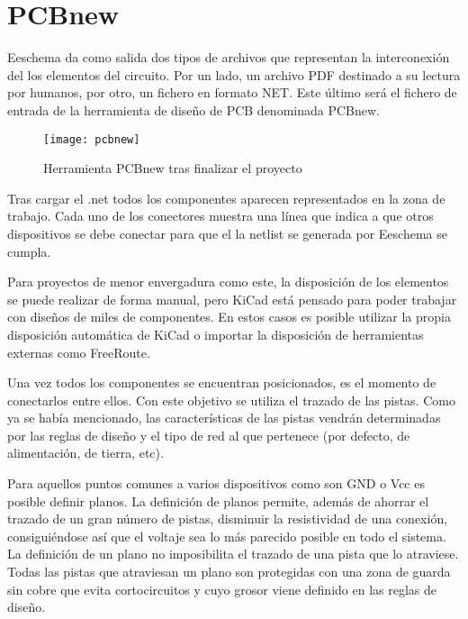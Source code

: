 \clearpage

\section{PCBnew\label{sec:PCBnew}}

Eeschema da como salida dos tipos de archivos que representan la interconexión del los elementos del circuito. Por un lado, un archivo PDF destinado a su lectura por humanos, por otro, un fichero en formato NET. Este último será el fichero de entrada de la herramienta de diseño de \acrshort{PCB} denominada PCBnew. 

\begin{figure} [h]
    \centering
    \texttt{[image: pcbnew]}
    \caption{Herramienta PCBnew tras finalizar el proyecto}
    \label{fig:pcbnew_1}
\end{figure}

Tras cargar el .net todos los componentes aparecen representados en la zona de trabajo. Cada uno de los conectores muestra una línea que indica a que otros dispositivos se debe conectar para que el la netlist se generada por Eeschema se cumpla.

Para proyectos de menor envergadura como este, la disposición de los elementos se puede realizar de forma manual, pero KiCad está pensado para poder trabajar con diseños de miles de componentes. En estos casos es posible utilizar la propia disposición automática de KiCad o importar la disposición de herramientas externas como FreeRoute.

Una vez todos los componentes se encuentran posicionados, es el momento de conectarlos entre ellos. Con este objetivo se utiliza el trazado de las pistas. Como ya se había mencionado, las características de las pistas vendrán determinadas por las reglas de diseño y el tipo de red al que pertenece (por defecto, de alimentación, de tierra, etc).

Para aquellos puntos comunes a varios dispositivos como son GND o Vcc es posible definir planos. La definición de planos permite, además de ahorrar el trazado de un gran número de pistas, disminuir la resistividad de una conexión, consiguiéndose así que el voltaje sea lo más parecido posible en todo el sistema.
\\La definición de un plano no imposibilita el trazado de una pista que lo atraviese. Todas las pistas que atraviesan un plano son protegidas con una zona de guarda sin cobre que evita cortocircuitos y cuyo grosor viene definido en las reglas de diseño.

